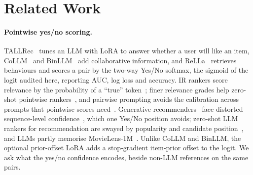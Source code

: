 \section{Related Work}
\label{sec:related}

\paragraph{Pointwise yes/no scoring.}
TALLRec~\citep{bao2023tallrec} tunes an LLM with LoRA to answer whether a user will like an item, CoLLM~\citep{zhang2025collm} and
BinLLM~\citep{zhang2024binllm} add collaborative information, and ReLLa~\citep{lin2024rella} retrieves behaviours and scores a pair
by the two-way Yes/No softmax, the sigmoid of the logit audited here, reporting AUC, log loss and accuracy. IR rankers score
relevance by the probability of a ``true'' token~\citep{nogueira2020document}; finer relevance grades help zero-shot pointwise
rankers~\citep{zhuang2024beyond}, and pairwise prompting avoids the calibration across prompts that pointwise scores
need~\citep{qin2024prp}. Generative recommenders~\citep{geng2022p5,liao2024llara,bao2025bigrec} face distorted sequence-level
confidence~\citep{bao2024d3}, which one Yes/No position avoids; zero-shot LLM rankers for recommendation are swayed by popularity and
candidate position~\citep{hou2024llmrank}, and LLMs partly memorise MovieLens-1M~\citep{dipalma2025memorize}.
Unlike CoLLM and BinLLM, the optional prior-offset LoRA adds a stop-gradient item-prior offset to the logit.
We ask what the yes/no confidence encodes, beside non-LLM references on the same pairs.

